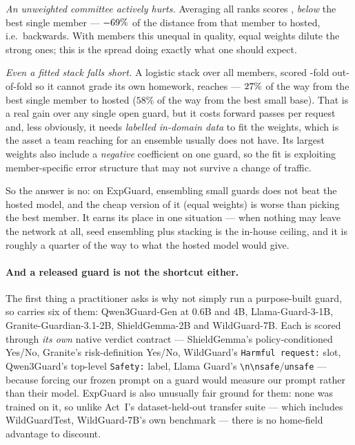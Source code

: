 \documentclass[11pt]{article}
\newcommand{\code}[1]{\texttt{\small #1}}
\begin{document}
\emph{An unweighted committee actively hurts.} Averaging all \FrontierEnsMembers{} ranks scores
\FrontierEnsCommittee, \emph{below} the best single member --- $-69\%$ of
the distance from that member to hosted, i.e.\ backwards. With members this unequal in quality, equal weights
dilute the strong ones; this is the  spread doing exactly what one should
expect.

\emph{Even a fitted stack falls short.} A logistic stack over all \FrontierEnsMembers{} members,
scored \FrontierEnsFolds-fold out-of-fold so it cannot grade its own homework, reaches
\FrontierEnsStack{} --- $27\%$ of the way from the best single member to hosted
($58\%$ of the way from the best small base). That is a real gain over
any single open guard, but it costs \FrontierEnsMembers{} forward passes per request and, less
obviously, it needs \emph{labelled in-domain data} to fit the weights, which is the asset a team
reaching for an ensemble usually does not have. Its largest weights also include a
\emph{negative} coefficient on one guard, so the fit is exploiting member-specific error
structure that may not survive a change of traffic.

So the answer is no: on ExpGuard, ensembling small guards does not beat the hosted model, and the cheap
version of it (equal weights) is worse than picking the best member. It earns its place in one
situation --- when nothing may leave the network at all, seed ensembling plus stacking is the
in-house ceiling, and it is roughly a quarter of the way to what the hosted model would give.

\paragraph{And a released guard is not the shortcut either.} The first thing a practitioner
asks is why not simply run a purpose-built guard, so  carries six of them:
Qwen3Guard-Gen at 0.6B and 4B, Llama-Guard-3-1B, Granite-Guardian-3.1-2B, ShieldGemma-2B and
WildGuard-7B. Each is scored through \emph{its own} native verdict contract --- ShieldGemma's
policy-conditioned Yes/No, Granite's risk-definition Yes/No, WildGuard's
\code{Harmful request:} slot, Qwen3Guard's top-level \code{Safety:} label, Llama Guard's
\code{\textbackslash n\textbackslash nsafe}/\code{unsafe} --- because forcing our frozen prompt
on a guard would measure our prompt rather than their model. ExpGuard is also unusually fair
ground for them: none was trained on it, so unlike Act~I's dataset-held-out transfer suite ---
which includes WildGuardTest, WildGuard-7B's own benchmark --- there is no home-field advantage
to discount.
\end{document}
